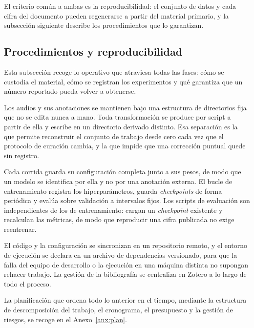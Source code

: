 El criterio común a ambas es la reproducibilidad: el conjunto de datos y cada
cifra del documento pueden regenerarse a partir del material primario, y la
subsección siguiente describe los procedimientos que lo garantizan.

\subsection{Procedimientos y reproducibilidad}
\label{sec:procedimientos}

Esta subsección recoge lo operativo que atraviesa todas las fases: cómo se custodia el material, cómo se
registran los experimentos y qué garantiza que un número reportado pueda volver a
obtenerse.

 Los audios y sus anotaciones se
mantienen bajo una estructura de directorios fija que no se edita nunca a mano.
Toda transformación se produce por script a partir de ella y escribe en un
directorio derivado distinto. Esa separación es la que permite reconstruir el
conjunto de trabajo desde cero cada vez que el protocolo de curación cambia, y la
que impide que una corrección puntual quede sin registro.

 Cada corrida guarda su configuración
completa junto a sus pesos, de modo que un modelo se identifica por ella y no por
una anotación externa. El bucle de
entrenamiento registra los hiperparámetros, guarda \textit{checkpoints} de forma
periódica y evalúa sobre validación a intervalos fijos. Los scripts de evaluación
son independientes de los de entrenamiento: cargan un \textit{checkpoint}
existente y recalculan las métricas, de modo que reproducir una cifra publicada
no exige reentrenar.

 El código y la configuración se sincronizan en
un repositorio remoto, y el entorno de ejecución se declara en un archivo de
dependencias versionado, para que la falla del equipo de desarrollo o la
ejecución en una máquina distinta no supongan rehacer trabajo. La gestión de la
bibliografía se centraliza en Zotero a lo largo de todo el proceso.

La planificación que ordena todo lo anterior en el tiempo, mediante la estructura de
descomposición del trabajo, el cronograma, el presupuesto y la gestión de riesgos, se recoge
en el Anexo~\ref{anx:plan}.

